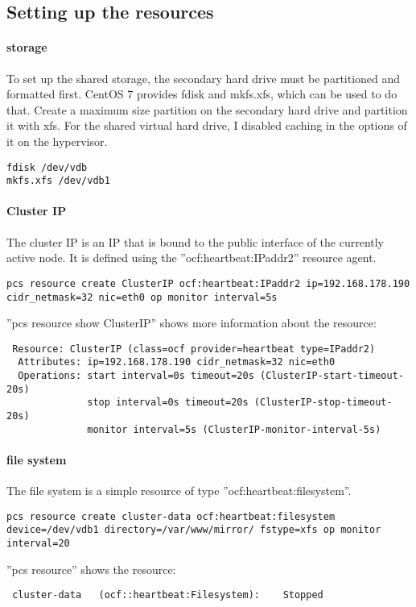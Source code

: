 \subsection{Setting up the resources}
\paragraph{storage}
To set up the shared storage, the secondary hard drive must be partitioned
and formatted first. CentOS 7 provides fdisk and mkfs.xfs, which
can be used to do that. Create a maximum size partition on the secondary hard drive
and partition it with xfs. For the shared virtual hard drive, I disabled caching in
the options of it on the hypervisor.
\begin{lstlisting}
fdisk /dev/vdb
mkfs.xfs /dev/vdb1
\end{lstlisting}
\paragraph{Cluster IP}
The cluster IP is an IP that is bound to the public interface of the currently
active node.
It is defined using the ''ocf:heartbeat:IPaddr2'' resource agent.
\begin{lstlisting}
pcs resource create ClusterIP ocf:heartbeat:IPaddr2 ip=192.168.178.190 cidr_netmask=32 nic=eth0 op monitor interval=5s
\end{lstlisting}
''pcs resource show ClusterIP'' shows more information about the resource:
\begin{lstlisting}
 Resource: ClusterIP (class=ocf provider=heartbeat type=IPaddr2)
  Attributes: ip=192.168.178.190 cidr_netmask=32 nic=eth0 
  Operations: start interval=0s timeout=20s (ClusterIP-start-timeout-20s)
              stop interval=0s timeout=20s (ClusterIP-stop-timeout-20s)
              monitor interval=5s (ClusterIP-monitor-interval-5s)
\end{lstlisting}
\paragraph{file system}
The file system is a simple resource of type ''ocf:heartbeat:filesystem''.
\begin{lstlisting}
pcs resource create cluster-data ocf:heartbeat:filesystem device=/dev/vdb1 directory=/var/www/mirror/ fstype=xfs op monitor interval=20
\end{lstlisting}
''pcs resource'' shows the resource:
\begin{lstlisting}
 cluster-data	(ocf::heartbeat:Filesystem):	Stopped 
\end{lstlisting}
